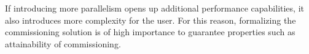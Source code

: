 If introducing more parallelism opens up additional performance capabilities, it also introduces more complexity for the user. For this reason, formalizing the commissioning solution is of high importance to guarantee properties such as attainability of commissioning.





